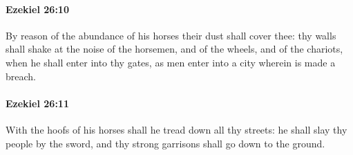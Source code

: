 		\paragraph{Ezekiel 26:10} %
			\label{EZEKIEL-26-10}

			By reason of the abundance of his horses their dust shall cover thee: thy walls shall shake at the noise of the horsemen, and of the wheels, and of the chariots, when he shall enter into thy gates, as men enter into a city wherein is made a breach.


		\paragraph{Ezekiel 26:11} %
			\label{EZEKIEL-26-11}

			With the hoofs of his horses shall he tread down all thy streets: he shall slay thy people by the sword, and thy strong garrisons shall go down to the ground.

